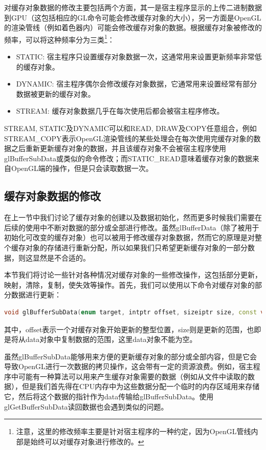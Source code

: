 对缓存对象数据的修改主要包括两个方面，其一是宿主程序显示的上传二进制数据到GPU（这包括相应的GL命令可能会修改缓存对象的大小），另一方面是OpenGL的渲染管线（例如着色器内）可能会修改缓存对象的数据。根据缓存对象被修改的频率，可以将这种频率分为三类\footnote{注意，这里的修改频率主要是针对宿主程序的一种约定，因为OpenGL管线内部是始终可以对缓存对象进行修改的。}：

\begin{itemize}
	\item STATIC: 宿主程序只设置缓存对象数据一次，这通常用来设置更新频率非常低的缓存对象。
	\item DYNAMIC: 宿主程序偶尔会修改缓存对象数据，它通常用来设置经常有部分数据被更新的缓存对象。
	\item STREAM: 缓存对象数据几乎在每次使用后都会被宿主程序修改。
\end{itemize}

STREAM, STATIC及DYNAMIC可以和READ, DRAW及COPY任意组合，例如STREAM\_COPY表示OpenGL渲染管线的某些处理会在每次使用完缓存对象的数据之后重新更新缓存对象的数据，并且该缓存对象不会被宿主程序使用glBufferSubData​或类似的命令修改；而STATIC\_READ意味着缓存对象的数据来自OpenGL端的操作，但是只会读取数据一次。 




\subsection{缓存对象数据的修改}
在上一节中我们讨论了缓存对象的创建以及数据初始化，然而更多时候我们需要在后续的使用中不断对数据的部分或全部进行修改。虽然glBufferData（除了被用于初始化可改变的缓存对象）也可以被用于修改缓存对象数据，然而它的原理是对整个缓存对象的存储进行重新分配，所以如果我们只希望更新缓存对象的一部分数据，则这显然是不合适的。

本节我们将讨论一些针对各种情况对缓存对象的一些修改操作，这包括部分更新，映射，清除，复制，使失效等操作。首先，我们可以使用以下命令对缓存对象的部分数据进行更新：

\begin{lstlisting}[language=C++]
void glBufferSubData​(enum target, intptr offset, sizeiptr size, const void *data)
\end{lstlisting}

其中，offset表示一个对缓存对象开始更新的整型位置，size则是更新的范围，也即是将从data对象中复制数据的范围，这里data对象不能为空。

虽然glBufferSubData能够用来方便的更新缓存对象的部分或全部内容，但是它会导致OpenGL进行一次数据的拷贝操作，这会带有一定的资源浪费。例如，宿主程序中可能有一种算法可以用来产生缓存对象需要的数据（例如从文件中读取的数据），但是我们首先得在CPU内存中为这些数据分配一个临时的内存区域用来存储它，然后将这个数据的指针作为data传输给glBufferSubData。使用glGetBufferSubData读回数据也会遇到类似的问题。


